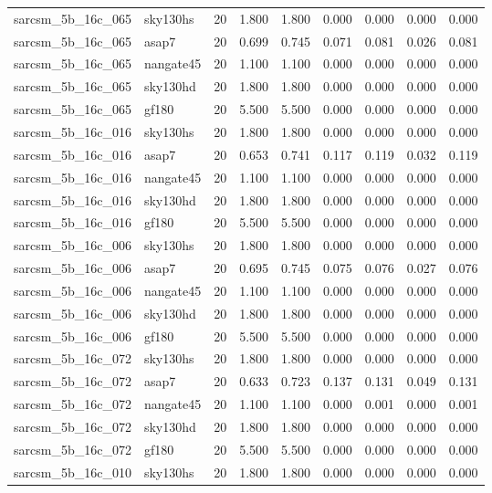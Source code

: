 \begin{tabular}{llrrrrrrr}
sarcsm\_5b\_16c\_065 & sky130hs & 20 & 1.800 & 1.800 & 0.000 & 0.000 & 0.000 & 0.000 \\
sarcsm\_5b\_16c\_065 & asap7 & 20 & 0.699 & 0.745 & 0.071 & 0.081 & 0.026 & 0.081 \\
sarcsm\_5b\_16c\_065 & nangate45 & 20 & 1.100 & 1.100 & 0.000 & 0.000 & 0.000 & 0.000 \\
sarcsm\_5b\_16c\_065 & sky130hd & 20 & 1.800 & 1.800 & 0.000 & 0.000 & 0.000 & 0.000 \\
sarcsm\_5b\_16c\_065 & gf180 & 20 & 5.500 & 5.500 & 0.000 & 0.000 & 0.000 & 0.000 \\
sarcsm\_5b\_16c\_016 & sky130hs & 20 & 1.800 & 1.800 & 0.000 & 0.000 & 0.000 & 0.000 \\
sarcsm\_5b\_16c\_016 & asap7 & 20 & 0.653 & 0.741 & 0.117 & 0.119 & 0.032 & 0.119 \\
sarcsm\_5b\_16c\_016 & nangate45 & 20 & 1.100 & 1.100 & 0.000 & 0.000 & 0.000 & 0.000 \\
sarcsm\_5b\_16c\_016 & sky130hd & 20 & 1.800 & 1.800 & 0.000 & 0.000 & 0.000 & 0.000 \\
sarcsm\_5b\_16c\_016 & gf180 & 20 & 5.500 & 5.500 & 0.000 & 0.000 & 0.000 & 0.000 \\
sarcsm\_5b\_16c\_006 & sky130hs & 20 & 1.800 & 1.800 & 0.000 & 0.000 & 0.000 & 0.000 \\
sarcsm\_5b\_16c\_006 & asap7 & 20 & 0.695 & 0.745 & 0.075 & 0.076 & 0.027 & 0.076 \\
sarcsm\_5b\_16c\_006 & nangate45 & 20 & 1.100 & 1.100 & 0.000 & 0.000 & 0.000 & 0.000 \\
sarcsm\_5b\_16c\_006 & sky130hd & 20 & 1.800 & 1.800 & 0.000 & 0.000 & 0.000 & 0.000 \\
sarcsm\_5b\_16c\_006 & gf180 & 20 & 5.500 & 5.500 & 0.000 & 0.000 & 0.000 & 0.000 \\
sarcsm\_5b\_16c\_072 & sky130hs & 20 & 1.800 & 1.800 & 0.000 & 0.000 & 0.000 & 0.000 \\
sarcsm\_5b\_16c\_072 & asap7 & 20 & 0.633 & 0.723 & 0.137 & 0.131 & 0.049 & 0.131 \\
sarcsm\_5b\_16c\_072 & nangate45 & 20 & 1.100 & 1.100 & 0.000 & 0.001 & 0.000 & 0.001 \\
sarcsm\_5b\_16c\_072 & sky130hd & 20 & 1.800 & 1.800 & 0.000 & 0.000 & 0.000 & 0.000 \\
sarcsm\_5b\_16c\_072 & gf180 & 20 & 5.500 & 5.500 & 0.000 & 0.000 & 0.000 & 0.000 \\
sarcsm\_5b\_16c\_010 & sky130hs & 20 & 1.800 & 1.800 & 0.000 & 0.000 & 0.000 & 0.000 \\

\end{tabular}
